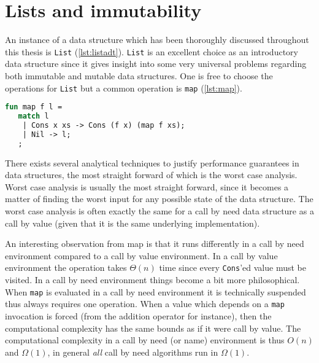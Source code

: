 
\section{Lists and immutability}
An instance of a data structure which has been thoroughly discussed throughout this thesis is \texttt{List} (\autoref{lst:listadt}).
\texttt{List} is an excellent choice as an introductory data structure since it gives insight into some very universal problems regarding both immutable and mutable data structures.
One is free to choose the operations for \texttt{List} but a common operation is \texttt{map} (\autoref{lst:map}).
\begin{lstlisting}[language=ML,caption={Mapping from \texttt{List a} to \texttt{List b}},label={lst:map},mathescape=true]
fun map f l = 
   match l
    | Cons x xs -> Cons (f x) (map f xs);
    | Nil -> l;
   ;
\end{lstlisting}

There exists several analytical techniques to justify performance guarantees in data structures, the most straight forward of which is the worst case analysis.
Worst case analysis is usually the most straight forward, since it becomes a matter of finding the worst input for any possible state of the data structure.
The worst case analysis is often exactly the same for a call by need data structure as a call by value (given that it is the same underlying implementation).

An interesting observation from map is that it runs differently in a call by need environment compared to a call by value environment.
In a call by value environment the operation takes $\Theta(n)$ time since every \texttt{Cons}'ed value must be visited.
In a call by need environment things become a bit more philosophical.
When \texttt{map} is evaluated in a call by need environment it is technically suspended thus always requires one operation.
When a value which depends on a \texttt{map} invocation is forced (from the addition operator for instance), then the computational complexity has the same bounds as if it were call by value.
The computational complexity in a call by need (or name) environment is thus $O(n)$ and $\Omega(1)$, in general \textit{all} call by need algorithms run in $\Omega(1)$.
